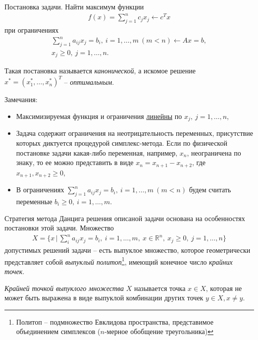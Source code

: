 \documentclass[%
	11pt,
	a4paper,
	utf8,
		]{article}
\begin{document}
Постановка задачи. Найти максимум функции
\begin{align*}
f(x) = \sum_{j=1}^{n} c_j x_j \leftarrow c^T x
\end{align*}
при ограничениях
\begin{align*}
	\sum_{j=1}^{n} a_{ij} x_j = b_i, \ i = 1, \ldots, m\  (m < n) \leftarrow Ax = b,\\
	x_j \geqslant 0, \ j = 1, \ldots, n.
\end{align*}

Такая постановка называется \emph{канонической}, а искомое решение $ x^{*} = (x_1^{*}, \ldots, x_n^{*})^T $ -- \emph{оптимальным}.

Замечания:
\begin{itemize}
	\item Максимизируемая функция и ограничения \underline{линейны} по $ x_j, \ j = 1, \ldots, n $,
	
	\item Задача содержит ограничения на неотрицательность переменных, присутствие которых диктуется процедурой симплекс-метода. Если по физической постановке задачи какая-либо переменная, например, $ x_n $, неограничена по знаку, то ее можно представить в виде $ x_n = x_{n+1} - x_{n+2} $, где $ x_{n+1}, x_{n+2} \geqslant 0 $,
	
	\item В ограничениях $ \sum\limits_{j=1}^{n} a_{ij} x_j = b_i, \ i = 1, \ldots, m\  (m < n) $ будем считать переменные $ b_i \geqslant 0, \ i = 1, \ldots, m $.
\end{itemize}

Стратегия метода Данцига решения описаной задачи основана на особенностях постановки этой задачи. Множество
\begin{align*}
	X = \{ x \, | \, \sum_{i}^{n} a_{ij} x_j = b_i, \ i = 1, \ldots, m, \ x \in \mathbb{R}^n, \ x_j \geqslant 0, \ j = 1, \ldots, n \}
\end{align*}
допустимых решений задачи -- есть выпуклое множество, которое геометрически представляет собой \emph{выпуклый политоп}\footnote{Политоп -- подмножество Евклидова пространства, представимое объединением симплексов ($ n $-мерное обобщение треугольника)}, имеющий конечное число \emph{крайних точек}.

\emph{Крайней точкой выпуклого множества} $ X $ называется точка $ x \in X $, которая не может быть выражена в виде выпуклой комбинации других точек $ y \in X, x \neq y $.
\end{document}
